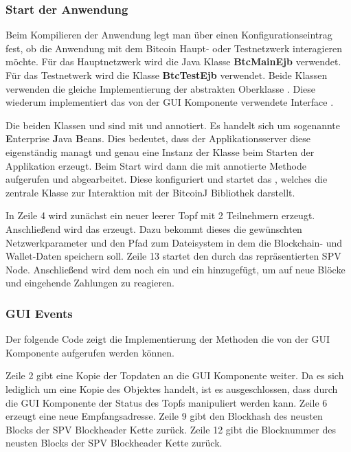 \subsubsection{Start der Anwendung}
Beim Kompilieren der Anwendung legt man über einen Konfigurationseintrag fest, ob die Anwendung mit dem Bitcoin Haupt- oder Testnetzwerk interagieren möchte.
Für das Hauptnetzwerk wird die Java Klasse \textbf{BtcMainEjb} verwendet. Für das Testnetwerk wird die Klasse \textbf{BtcTestEjb} verwendet. Beide Klassen verwenden die gleiche Implementierung der abstrakten Oberklasse . Diese wiederum implementiert das von der GUI Komponente verwendete Interface .


Die beiden Klassen  und  sind mit  und  annotiert. Es handelt sich um sogenannte \textbf{E}nterprise \textbf{J}ava \textbf{B}eans. Dies bedeutet, dass der Applikationsserver diese eigenständig managt und genau eine Instanz der Klasse beim Starten der Applikation erzeugt. Beim Start wird dann die mit  annotierte  Methode aufgerufen und abgearbeitet. Diese konfiguriert und startet das , welches die zentrale Klasse zur Interaktion mit der BitcoinJ Bibliothek darstellt.

 In Zeile 4 wird zunächst ein neuer leerer Topf mit 2 Teilnehmern erzeugt. Anschließend wird das  erzeugt. Dazu bekommt dieses die gewünschten Netzwerkparameter und den Pfad zum Dateisystem in dem  die Blockchain- und Wallet-Daten speichern soll. Zeile 13 startet den durch das  repräsentierten SPV Node. Anschließend wird dem  noch ein  und ein  hinzugefügt, um auf neue Blöcke und eingehende Zahlungen zu reagieren.

\subsubsection{GUI Events}

Der folgende Code zeigt die Implementierung der Methoden die von der GUI Komponente aufgerufen werden können.

Zeile 2 gibt eine Kopie der Topdaten an die GUI Komponente weiter. Da es sich lediglich um eine Kopie des Objektes handelt, ist es ausgeschlossen, dass durch die GUI Komponente der Status des Topfs manipuliert werden kann. Zeile 6 erzeugt eine neue Empfangsadresse. Zeile 9 gibt den Blockhash des neusten Blocks der SPV Blockheader Kette zurück. Zeile 12 gibt die Blocknummer des neusten Blocks der SPV Blockheader Kette zurück.

